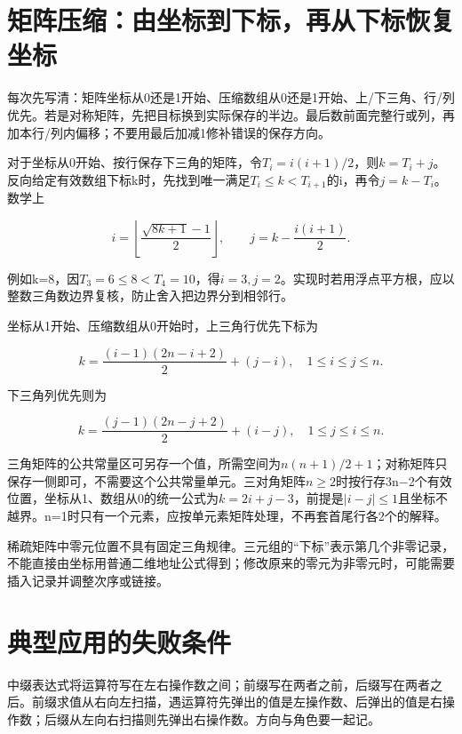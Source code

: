 \section{矩阵压缩：由坐标到下标，再从下标恢复坐标}\label{DS03-matrix-method}

\begin{methodbox}[完整行数加行内偏移]

每次先写清：矩阵坐标从0还是1开始、压缩数组从0还是1开始、上/下三角、行/列优先。若是对称矩阵，先把目标换到实际保存的半边。最后数前面完整行或列，再加本行/列内偏移；不要用最后加减1修补错误的保存方向。

\end{methodbox}

对于坐标从0开始、按行保存下三角的矩阵，令\(T_i=i(i+1)/2\)，则\(k=T_i+j\)。反向给定有效数组下标k时，先找到唯一满足\(T_i\le k<T_{i+1}\)的i，再令\(j=k-T_i\)。数学上

\[i=\left\lfloor\frac{\sqrt{8k+1}-1}{2}\right\rfloor,\qquad j=k-\frac{i(i+1)}2.\]

例如k=8，因\(T_3=6\le8<T_4=10\)，得\(i=3,j=2\)。实现时若用浮点平方根，应以整数三角数边界复核，防止舍入把边界分到相邻行。

坐标从1开始、压缩数组从0开始时，上三角行优先下标为

\[k=\frac{(i-1)(2n-i+2)}2+(j-i),\quad1\le i\le j\le n.\]

下三角列优先则为

\[k=\frac{(j-1)(2n-j+2)}2+(i-j),\quad1\le j\le i\le n.\]

三角矩阵的公共常量区可另存一个值，所需空间为\(n(n+1)/2+1\)；对称矩阵只保存一侧即可，不需要这个公共常量单元。三对角矩阵\(n\ge2\)时按行存3n\ensuremath{-}2个有效位置，坐标从1、数组从0的统一公式为\(k=2i+j-3\)，前提是\(|i-j|\le1\)且坐标不越界。n=1时只有一个元素，应按单元素矩阵处理，不再套首尾行各2个的解释。

稀疏矩阵中零元位置不具有固定三角规律。三元组的``下标''表示第几个非零记录，不能直接由坐标用普通二维地址公式得到；修改原来的零元为非零元时，可能需要插入记录并调整次序或链接。

\section{典型应用的失败条件}\label{DS03-app-method}

中缀表达式将运算符写在左右操作数之间；前缀写在两者之前，后缀写在两者之后。前缀求值从右向左扫描，遇运算符先弹出的值是左操作数、后弹出的值是右操作数；后缀从左向右扫描则先弹出右操作数。方向与角色要一起记。

